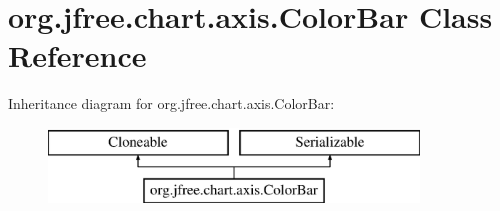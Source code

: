 \hypertarget{classorg_1_1jfree_1_1chart_1_1axis_1_1_color_bar}{}\section{org.\+jfree.\+chart.\+axis.\+Color\+Bar Class Reference}
\label{classorg_1_1jfree_1_1chart_1_1axis_1_1_color_bar}
Inheritance diagram for org.\+jfree.\+chart.\+axis.\+Color\+Bar\+:\begin{figure}[H]
\begin{center}
\leavevmode
\includegraphics[height=2.000000cm]{classorg_1_1jfree_1_1chart_1_1axis_1_1_color_bar}
\end{center}
\end{figure}
